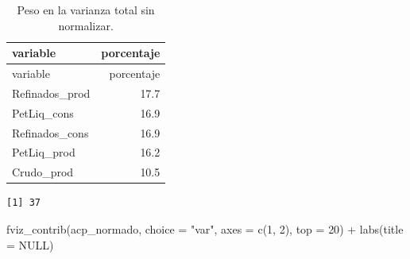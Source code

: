 \documentclass[oneside, openany, fontset=libertinus]{mitthesis}
\newenvironment{Shaded}{\begin{snugshade}}{\end{snugshade}}
\newcommand{\AttributeTok}[1]{\textcolor[rgb]{0.40,0.45,0.13}{#1}}
\newcommand{\ConstantTok}[1]{\textcolor[rgb]{0.56,0.35,0.01}{#1}}
\newcommand{\DecValTok}[1]{\textcolor[rgb]{0.68,0.00,0.00}{#1}}
\newcommand{\FunctionTok}[1]{\textcolor[rgb]{0.28,0.35,0.67}{#1}}
\newcommand{\NormalTok}[1]{\textcolor[rgb]{0.00,0.23,0.31}{#1}}
\newcommand{\OtherTok}[1]{\textcolor[rgb]{0.00,0.23,0.31}{#1}}
\newcommand{\SpecialCharTok}[1]{\textcolor[rgb]{0.37,0.37,0.37}{#1}}
\newcommand{\StringTok}[1]{\textcolor[rgb]{0.13,0.47,0.30}{#1}}
\newenvironment{codres}%
  {\par\smallskip\noindent\begin{minipage}[t]{0.57\linewidth}\vspace{0pt}}%
  {\end{minipage}\par\medskip}
\newcommand{\codressep}{\end{minipage}\hfill\begin{minipage}[t]{0.40\linewidth}\vspace{0pt}}
\begin{document}
\begin{longtable}[]{@{}lr@{}}
\caption{Peso en la varianza total sin normalizar.}\tabularnewline
\toprule\noalign{}
variable & porcentaje \\
\midrule\noalign{}
\endfirsthead
\toprule\noalign{}
variable & porcentaje \\
\midrule\noalign{}
\endhead
\bottomrule\noalign{}
\endlastfoot
Refinados\_prod & 17.7 \\
PetLiq\_cons & 16.9 \\
Refinados\_cons & 16.9 \\
PetLiq\_prod & 16.2 \\
Crudo\_prod & 10.5 \\
\end{longtable}

\Needspace{1.52in}

\begin{codres}

\begin{Shaded}
\end{Shaded}

\codressep

\begin{verbatim}
[1] 37
\end{verbatim}

\end{codres}

\Needspace{4.27in}

\begin{Shaded}
\begin{Highlighting}[]
\FunctionTok{fviz\_contrib}\NormalTok{(acp\_normado, }\AttributeTok{choice =} \StringTok{"var"}\NormalTok{, }\AttributeTok{axes =} \FunctionTok{c}\NormalTok{(}\DecValTok{1}\NormalTok{, }\DecValTok{2}\NormalTok{),}
             \AttributeTok{top =} \DecValTok{20}\NormalTok{) }\SpecialCharTok{+}
  \FunctionTok{labs}\NormalTok{(}\AttributeTok{title =} \ConstantTok{NULL}\NormalTok{)}
\end{Highlighting}
\end{Shaded}
\end{document}
